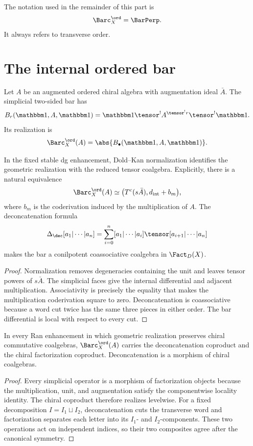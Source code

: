 The notation used in the remainder of this part is
\[
 \Barc_X^{\ord}=\BarPerp.
\]
It always refers to transverse order.

\chapter{The internal ordered bar}
Let $A$ be an augmented ordered chiral algebra with augmentation ideal $\bar A$. The simplicial two-sided bar has
\[
 B_r(\mathbbm1,A,\mathbbm1)=
 \mathbbm1\tensor^! A^{\tensor^!r}\tensor^!\mathbbm1.
\]
Its realization is
\[
 \Barc_X^{\ord}(A)=\abs{B_\bullet(\mathbbm1,A,\mathbbm1)}.
\]

\begin{theorem}
In the fixed stable dg enhancement, Dold--Kan normalization identifies the geometric realization with the reduced tensor coalgebra. Explicitly, there is a natural equivalence
\[
 \Barc_X^{\ord}(A)
 \simeq
 \bigl(T^c(s\bar A),d_{\mathrm{int}}+b_m\bigr),
\]
where $b_m$ is the coderivation induced by the multiplication of $A$. The deconcatenation formula
\[
 \Delta_{\dec}[a_1|\cdots|a_n]
 =\sum_{i=0}^n[a_1|\cdots|a_i]\tensor[a_{i+1}|\cdots|a_n]
\]
makes the bar a conilpotent coassociative coalgebra in $\Fact_D(X)$.
\end{theorem}
\begin{proof}
Normalization removes degeneracies containing the unit and leaves tensor powers of $s\bar A$. The simplicial faces give the internal differential and adjacent multiplication. Associativity is precisely the equality that makes the multiplication coderivation square to zero. Deconcatenation is coassociative because a word cut twice has the same three pieces in either order. The bar differential is local with respect to every cut.
\end{proof}

\begin{theorem}
In every Ran enhancement in which geometric realization preserves chiral commutative coalgebras, $\Barc_X^{\ord}(A)$ carries the deconcatenation coproduct and the chiral factorization coproduct. Deconcatenation is a morphism of chiral coalgebras.
\end{theorem}
\begin{proof}
Every simplicial operator is a morphism of factorization objects because the multiplication, unit, and augmentation satisfy the componentwise locality identity. The chiral coproduct therefore realizes levelwise. For a fixed decomposition $I=I_1\sqcup I_2$, deconcatenation cuts the transverse word and factorization separates each letter into its $I_1$- and $I_2$-components. These two operations act on independent indices, so their two composites agree after the canonical symmetry.
\end{proof}

